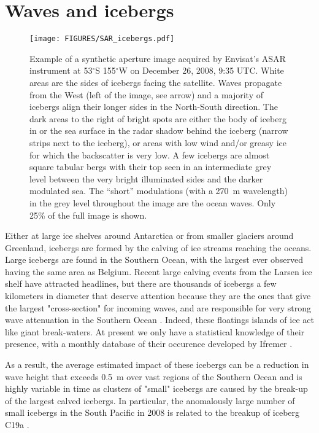 \section{Waves and icebergs}
\begin{figure}%
\begin{center}
 \texttt{[image: FIGURES/SAR\_icebergs.pdf]}
 \caption{Example of a synthetic aperture image acquired by Envisat's ASAR instrument at 
53$^\circ$S 155$^\circ$W on December 26, 2008, 9:35 UTC. White areas are the sides of icebergs facing the satellite.
Waves propagate from the West (left of the image, see arrow) and a majority of icebergs align their 
longer sides in the North-South direction. The dark areas to the right of bright spots are either the body of iceberg in or the sea surface in the radar shadow 
behind the iceberg (narrow strips next to the iceberg), or areas with low wind and/or greasy ice for which the backscatter is very low. 
A few icebergs are almost square tabular bergs with their top seen in an intermediate grey level between the very bright illuminated sides and the darker modulated
sea. The ``short'' modulations (with a 270~m wavelength) in the grey level throughout the image are the ocean waves. Only 25\% of the 
full image is shown.\label{fig:SAR_icebergs}}
 \end{center}
\end{figure}
Either at large ice shelves around Antarctica or from smaller glaciers around Greenland, icebergs are formed by the calving of ice streams reaching the oceans. Large icebergs are found in the Southern Ocean, with the largest ever observed having the same area as Belgium. Recent large calving events from the Larsen ice shelf have attracted headlines, but there are thousands of icebergs a few kilometers in diameter \citep{Tournadre&al.2016} that deserve attention because they are the ones that give the largest "cross-section" for incoming waves, and are responsible for very strong wave attenuation in the Southern Ocean \citep{Ardhuin&al.2011b}. Indeed, these floatings islands of ice act like giant break-waters. At present we only have a statistical knowledge of their presence, with a monthly database of their occurence developed by Ifremer \citep{Tournadre&al.2016}. 


As a result, the average estimated impact of these icebergs can be a reduction in wave height that exceeds 0.5~m over vast regions of the Southern Ocean and is highly variable in time as clusters of "small" icebergs are caused by the break-up of the largest calved icebergs. In particular, the anomalously large number of small icebergs in the South Pacific in 2008 is related to the breakup of iceberg C19a \citep{Tournadre&al.2012}.

